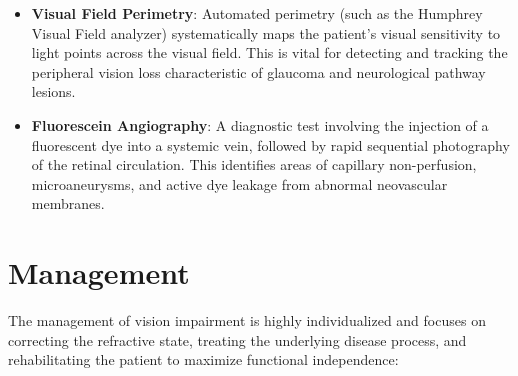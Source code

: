 \begin{itemize}
    \item \textbf{Visual Field Perimetry}: Automated perimetry (such as the Humphrey Visual Field analyzer) systematically maps the patient's visual sensitivity to light points across the visual field. This is vital for detecting and tracking the peripheral vision loss characteristic of glaucoma and neurological pathway lesions.
    \item \textbf{Fluorescein Angiography}: A diagnostic test involving the injection of a fluorescent dye into a systemic vein, followed by rapid sequential photography of the retinal circulation. This identifies areas of capillary non-perfusion, microaneurysms, and active dye leakage from abnormal neovascular membranes.
\end{itemize}

\section*{Management}
The management of vision impairment is highly individualized and focuses on correcting the refractive state, treating the underlying disease process, and rehabilitating the patient to maximize functional independence:
